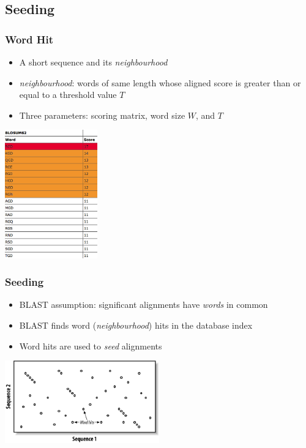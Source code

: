 \documentclass[table]{beamer}
\begin{document}
  \subsection{Seeding}
  \begin{frame}
    \frametitle{Word Hit}
    \begin{itemize}
      \item A short sequence and its \emph{neighbourhood}
      \item \emph{neighbourhood}: words of same length whose aligned score is greater than or equal to a threshold value $T$
      \item Three parameters: scoring matrix, word size $W$, and $T$
    \end{itemize}
    \begin{center}
      \includegraphics[width=0.3\textwidth]{images/neighbourhood} 
    \end{center}    
  \end{frame}

  \begin{frame}
    \frametitle{Seeding}
    \begin{itemize}
      \item BLAST assumption: significant alignments have \emph{words} in common
      \item BLAST finds word (\emph{neighbourhood}) hits in the database index
      \item Word hits are used to \textit{seed} alignments
    \end{itemize}
    \begin{center}
      \includegraphics[width=0.5\textwidth]{images/seeding} 
    \end{center}    
  \end{frame}
\end{document}
